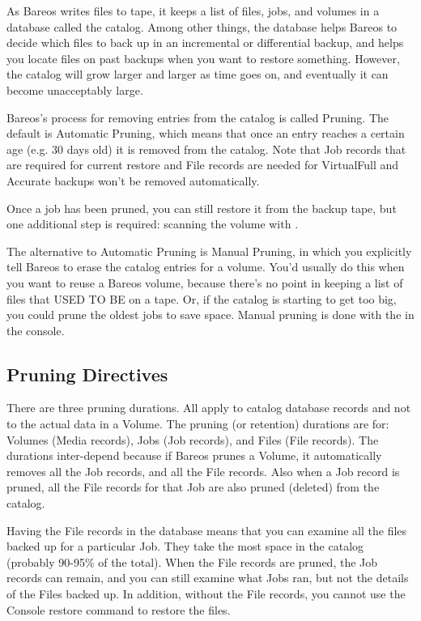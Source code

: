 As Bareos writes files to tape, it keeps a list of files, jobs, and volumes
in a database called the catalog.  Among other things, the database helps
Bareos to decide which files to back up in an incremental or differential
backup, and helps you locate files on past backups when you want to restore
something.  However, the catalog will grow larger and larger as time goes
on, and eventually it can become unacceptably large.

Bareos's process for removing entries from the catalog is called Pruning.  The
default is Automatic Pruning, which means that once an entry reaches a certain
age (e.g.  30 days old) it is removed from the catalog. Note that
Job records that are required for current restore and
File records are needed for VirtualFull and Accurate backups
won't be removed automatically.

Once a job has been
pruned, you can still restore it from the backup tape, but one additional step
is required: scanning the volume with .

The alternative to Automatic Pruning is Manual Pruning,
in which you explicitly tell Bareos to erase the
catalog entries for a volume.  You'd usually do this when you want to reuse a
Bareos volume, because there's no point in keeping a list of files that USED TO
BE on a tape.  Or, if the catalog is starting to get too big, you could prune
the oldest jobs to save space.  Manual pruning is done with the  in the console.

\subsection{Pruning Directives}

There are three pruning durations. All apply to catalog database records and
not to the actual data in a Volume. The pruning (or retention) durations are
for: Volumes (Media records), Jobs (Job records), and Files (File records).
The durations inter-depend because if Bareos prunes a Volume, it
automatically removes all the Job records, and all the File records. Also when
a Job record is pruned, all the File records for that Job are also pruned
(deleted) from the catalog.

Having the File records in the database means that you can examine all the
files backed up for a particular Job. They take the most space in the catalog
(probably 90-95\% of the total). When the File records are pruned, the Job
records can remain, and you can still examine what Jobs ran, but not the
details of the Files backed up. In addition, without the File records, you
cannot use the Console restore command to restore the files.

